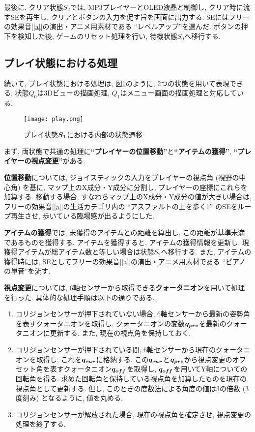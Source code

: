 \documentclass[10pt]{jsarticle}
\newcommand{\bm}[1]{{\mbox{\boldmath $#1$}}}
\begin{document}
最後に, クリア状態$S_2$では, MP3プレイヤーとOLED液晶と制御し, クリア時に流すSEを再生し, 
クリアとボタンの入力を促す旨を画面に出力する.
SEにはフリーの効果音[\ref{a}]の演出・アニメ用素材である ``レベルアップ''を選んだ.
ボタンの押下を検知した後,  ゲームのリセット処理を行い, 待機状態$S_0$へ移行する.

\subsection{プレイ状態における処理}

続いて, プレイ状態における処理は, 図\ref{play}のように, 2つの状態を用いて表現できる.
状態$Q_0$は3Dビューの描画処理, $Q_1$はメニュー画面の描画処理と対応している.

\begin{figure}[h]
	\centering
	\texttt{[image: play.png]}
	\caption{プレイ状態$\bm{S_1}$における内部の状態遷移}
 	\label{play}
\end{figure}

まず, 両状態で共通の処理に\textbf{``プレイヤーの位置移動''}と\textbf{``アイテムの獲得''}, 
\textbf{``プレイヤーの視点変更''}がある.

\textbf{位置移動}については, ジョイスティックの入力をプレイヤーの視点角 (視野の中心角) を基に, 
マップ上のX成分・Y成分に分割し, プレイヤーの座標にこれらを加算する.
移動する場合, すなわちマップ上のX成分・Y成分の値が大きい場合は, 
フリーの効果音[\ref{a}]の生活カテゴリ内の ``アスファルトの上を歩く1'' のSEをループ再生させ, 歩いている臨場感が出るようにした.

\textbf{アイテムの獲得}では, 未獲得のアイテムとの距離を算出し, この距離が基準未満であるものを獲得する.
アイテムを獲得すると, アイテムの獲得情報を更新し, 現獲得アイテムが総アイテム数と等しい場合は状態$S_2$へ移行する.
また, アイテムの獲得時には, SEとしてフリーの効果音[\ref{a}]の演出・アニメ用素材である ``ピアノの単音''を流す.

\textbf{視点変更}については, 6軸センサーから取得できる\textbf{クォータニオン}を用いて処理を行った.
具体的な処理手順は以下の通りである.

\begin{enumerate}[手順(1)]
\item	コリジョンセンサーが押下されていない場合, 6軸センサーから最新の姿勢角を表すクォータニオンを取得し, 
		クォータニオンの変数$\bm{q_{pre}}$を最新のクォータニオンに更新する.
		また, 現在の視点角を保持しておく.
\item	コリジョンセンサーが押下されている間,  6軸センサーから現在のクォータニオンを取得し, これを$\bm{q_{cur}}$に格納する.
		この$\bm{q_{cur}}$と$\bm{q_{pre}}$から視点変更のオフセット角を表すクォータニオン$\bm{q_{off}}$を取得し, 
		$\bm{q_{off}}$を用いてY軸についての回転角を得る.
		求めた回転角と保持している視点角を加算したものを現在の視点角として更新する.
		但し, このときの度数法による角度の値は3の倍数 (3度刻み) となるように, 値を丸める.
\item	コリジョンセンサーが解放された場合, 現在の視点角を確定させ, 視点変更の処理を終了する.
\end{enumerate}
\end{document}
